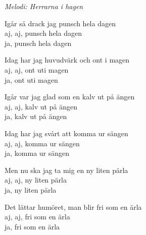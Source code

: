 {\footnotesize\textit{Melodi: Herrarna i hagen}}\par
\vspace{10pt}
Igår så drack jag punsch hela dagen\\
aj, aj, punsch hela dagen\\
ja, punsch hela dagen\par
\vspace{10pt}
Idag har jag huvudvärk och ont i magen\\
aj, aj, ont uti magen\\
ja, ont uti magen\par
\vspace{10pt}
Igår var jag glad som en kalv ut på ängen\\
aj, aj, kalv ut på ängen\\
ja, kalv ut på ängen\par
\vspace{10pt}
Idag har jag svårt att komma ur sängen\\
aj, aj, komma ur sängen\\
ja, komma ur sängen\par
\vspace{10pt}
Men nu ska jag ta mig en ny liten pärla\\
aj, aj, ny liten pärla\\
ja, ny liten pärla\par
\vspace{10pt}
Det lättar humöret, man blir fri som en ärla\\
aj, aj, fri som en ärla\\
ja, fri som en ärla
